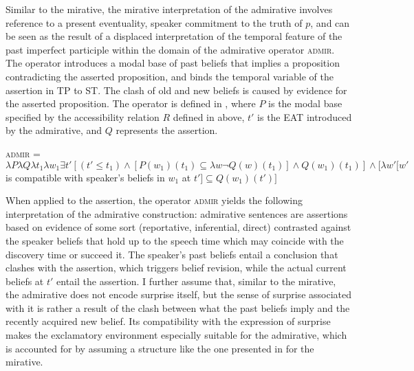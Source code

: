 \documentclass[output=paper]{langscibook}
\begin{document}
Similar to the  mirative, the mirative interpretation of the  admirative involves reference to a present eventuality, speaker commitment to the truth of $p$, and can be seen as the result of a displaced interpretation of the temporal feature of the past imperfect participle within the domain of the admirative operator \textsc{admir}. The operator introduces a modal base of past beliefs that implies a proposition contradicting the asserted proposition, and binds the temporal variable of the assertion in TP to ST.
The clash of old and new beliefs is caused by evidence for the asserted proposition.
The operator is defined in , where $P$ is the modal base specified by the accessibility relation $R$ defined in  above,
$t'$ is the EAT introduced by the admirative, and $Q$ represents the assertion.

\eanoraggedright\label{def:admir}
\textsc{admir} = $\lambda P \lambda Q \lambda t_1 \lambda w_1 \exists t' [ (t' \leq t_1 ) \wedge \allowbreak [ P(w_1)(t_1) \subseteq \lambda w \neg Q(w)(t_1)] \wedge \allowbreak Q(w_1)(t_1)] \allowbreak \wedge [\lambda w'[ w'$ is compatible with speaker's beliefs in $w_1$ at $t'] \allowbreak \subseteq Q(w_1)(t')]$
\z

\noindent When applied to the assertion, the operator \textsc{admir} yields the following interpretation of the admirative construction: admirative sentences are assertions based on evidence of some sort (reportative, inferential, direct) contrasted against the speaker beliefs that hold up to the speech time which may coincide with the discovery time or succeed it.
The speaker's past beliefs entail a conclusion that clashes with the assertion, which triggers belief revision, while the actual current beliefs at $t'$ entail the assertion.
I further assume that, similar to the  mirative, the  admirative does not encode surprise itself, but the sense of surprise associated with it is rather a result of the clash between what the past beliefs imply and the recently acquired new belief. Its compatibility with the expression of surprise makes the exclamatory environment especially suitable for the admirative, which is accounted for by assuming a structure like the one presented in  for the  mirative.
\end{document}
